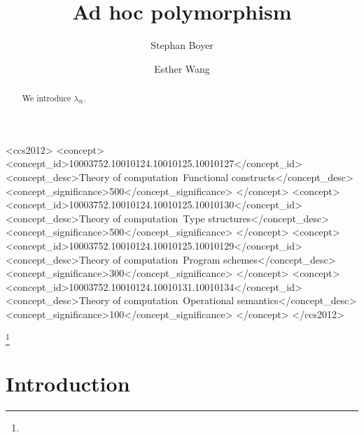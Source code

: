 \documentclass[acmlarge]{acmart}
\makeatletter
\newcommand\lambdaarobase{\lambda_@}
\makeatother
\begin{document}
\title{Ad hoc polymorphism}
\author{Stephan Boyer}
\author{Esther Wang}


\begin{abstract}
  We introduce $\lambdaarobase$.
\end{abstract}


%
\begin{CCSXML}
<ccs2012>
<concept>
<concept_id>10003752.10010124.10010125.10010127</concept_id>
<concept_desc>Theory of computation~Functional constructs</concept_desc>
<concept_significance>500</concept_significance>
</concept>
<concept>
<concept_id>10003752.10010124.10010125.10010130</concept_id>
<concept_desc>Theory of computation~Type structures</concept_desc>
<concept_significance>500</concept_significance>
</concept>
<concept>
<concept_id>10003752.10010124.10010125.10010129</concept_id>
<concept_desc>Theory of computation~Program schemes</concept_desc>
<concept_significance>300</concept_significance>
</concept>
<concept>
<concept_id>10003752.10010124.10010131.10010134</concept_id>
<concept_desc>Theory of computation~Operational semantics</concept_desc>
<concept_significance>100</concept_significance>
</concept>
</ccs2012>
\end{CCSXML}


%
%

\terms{}



\thanks{
}


\maketitle

\section{Introduction}
\end{document}
